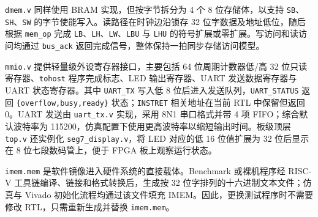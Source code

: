 ﻿\documentclass[12pt,a4paper]{ctexart}
\begin{document}
    \texttt{dmem.v} 同样使用 BRAM 实现，但按字节拆分为 4 个 8 位存储体，以支持 \texttt{SB}、\texttt{SH}、\texttt{SW} 的字节使能写入。读路径在时钟边沿锁存 32 位字数据及地址低位，随后根据 \texttt{mem\_op} 完成 \texttt{LB}、\texttt{LH}、\texttt{LW}、\texttt{LBU} 与 \texttt{LHU} 的符号扩展或零扩展。写访问和读访问均通过 \texttt{bus\_ack} 返回完成信号，整体保持一拍同步存储访问模型。

    \texttt{mmio.v} 提供轻量级外设寄存器接口，主要包括 64 位周期计数器低/高 32 位只读寄存器、\texttt{tohost} 程序完成标志、LED 输出寄存器、UART 发送数据寄存器与 UART 状态寄存器。其中 \texttt{UART\_TX} 写入低 8 位后进入发送队列，\texttt{UART\_STATUS} 返回 \texttt{\{overflow,busy,ready\}} 状态；\texttt{INSTRET} 相关地址在当前 RTL 中保留但返回 0。UART 发送由 \texttt{uart\_tx.v} 实现，采用 8N1 串口格式并带 4 项 FIFO；综合默认波特率为 115200，仿真配置下使用更高波特率以缩短输出时间。板级顶层 \texttt{top.v} 还实例化 \texttt{seg7\_display.v}，将 LED 对应的低 16 位值扩展为 32 位后显示在 8 位七段数码管上，便于 FPGA 板上观察运行状态。

    \texttt{imem.mem} 是软件镜像进入硬件系统的直接载体。Benchmark 或裸机程序经 RISC-V 工具链编译、链接和格式转换后，生成按 32 位字排列的十六进制文本文件；仿真与 Vivado 初始化流程均通过该文件填充 IMEM。因此，更换测试程序时不需要修改 RTL，只需重新生成并替换 \texttt{imem.mem}。
\end{document}
